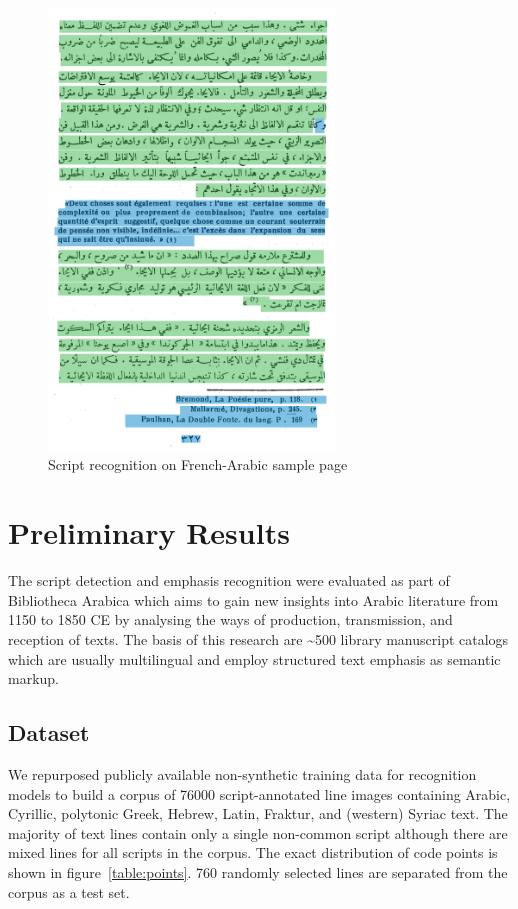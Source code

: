 \begin{figure}
	\includegraphics[width=0.68\textwidth]{high.png}
	\caption{Script recognition on French-Arabic sample page}
	\label{fig:read_high}
\end{figure}

\section{Preliminary Results}

The script detection and emphasis recognition were evaluated as part of
Bibliotheca Arabica which aims to gain new insights into Arabic literature from
1150 to 1850 CE by analysing the ways of production, transmission, and
reception of texts. The basis of this research are \textasciitilde 500 library
manuscript catalogs which are usually multilingual and employ structured text
emphasis as semantic markup.

\subsection{Dataset}

We repurposed publicly available non-synthetic training data for recognition
models to build a corpus of 76000 script-annotated line images containing
Arabic, Cyrillic, polytonic Greek, Hebrew, Latin, Fraktur, and (western) Syriac
text. The majority of text lines contain only a single non-common script
although there are mixed lines for all scripts in the corpus. The exact
distribution of code points is shown in figure~\ref{table:points}. 760 randomly
selected lines are separated from the corpus as a test set.

